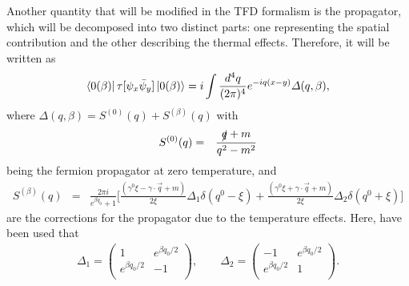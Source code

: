\documentclass[11pt,showpacs,preprintnumbers,amsmath,amssymb,prd,nofootinbib,superscriptaddress]{revtex4-2}
\newcommand{\bea}{\begin{eqnarray}}
\newcommand{\eea}{\end{eqnarray}}
\begin{document}
Another quantity that will be modified in the TFD formalism is the propagator, which will be decomposed into two distinct parts: one representing the spatial contribution and the other describing the thermal effects. Therefore, it will be written as
\begin{eqnarray}
    \bra{0(\beta)}\tau[\psi_x\Bar{\psi}_y]\ket{0(\beta)}=i\int\frac{d^4q}{(2\pi)^4}e^{-iq(x-y)}\Delta(q,\beta),
\end{eqnarray}
where $\Delta(q,\beta)=S^{(0)}(q)+S^{(\beta)}(q)$ with
\begin{eqnarray}
    S^{(0)}(q)&=&\frac{\slashed{q}+m}{q^2-m^2}
\end{eqnarray}
being the fermion propagator at zero temperature, and
\bea
S^{(\beta)}(q)&=&\frac{2\pi i}{e^{\beta q_0}+1}\Bigg[\frac{(\gamma^0\xi-\gamma\cdot\Vec{q}+m)}{2\xi}\Delta_1\delta(q^0-\xi)+\frac{(\gamma^0\xi+\gamma\cdot\Vec{q}+m)}{2\xi}\Delta_2\delta(q^0+\xi)\Bigg]\label{3.32}
\eea
are the corrections for the propagator due to the temperature effects.
Here, have been used that
\bea
    \Delta_1=\begin{pmatrix}
1 & e^{\beta q_0/2}\\
e^{\beta q_0/2} & -1 \\
\end{pmatrix}, \quad\quad
    \Delta_2=\begin{pmatrix}
-1 & e^{\beta q_0/2}\\
e^{\beta q_0/2} & 1 \\
\end{pmatrix}.
\eea
\end{document}
